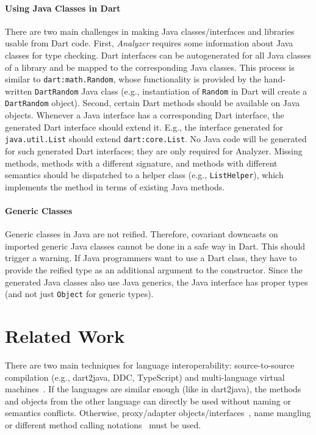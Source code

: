 \documentclass[sigplan]{acmart}
\begin{document}
\paragraph{Using Java Classes in Dart}
There are two main challenges in making Java classes/interfaces and libraries usable from Dart code. First, \emph{Analyzer} requires some information about Java classes for type checking. Dart interfaces can be autogenerated for all Java classes of a library and be mapped to the corresponding Java classes. This process is similar to \texttt{dart:math.Random}, whose functionality is provided by the hand-written \texttt{DartRandom} Java class (e.g., instantiation of \texttt{Random} in Dart will create a \texttt{DartRandom} object). Second, certain Dart methods should be available on Java objects. Whenever a Java interface has a corresponding Dart interface, the generated Dart interface should extend it. E.g., the interface generated for \texttt{java.util.List} should extend \texttt{dart:core.List}. No Java code will be generated for such generated Dart interfaces; they are only required for Analyzer. Missing methods, methods with a different signature, and methods with different semantics should be dispatched to a helper class (e.g., \texttt{ListHelper}), which implements the method in terms of existing Java methods.

\paragraph{Generic Classes}
Generic classes in Java are not reified. Therefore, covariant downcasts on imported generic Java classes cannot be done in a safe way in Dart. This should trigger a warning. If Java programmers want to use a Dart class, they have to provide the reified type as an additional argument to the constructor. Since the generated Java classes also use Java generics, the Java interface has proper types (and not just \texttt{Object} for generic types).


\section{Related Work}
There are two main techniques for language interoperability: source-to-source compilation (e.g., dart2java, DDC, TypeScript) and multi-language virtual machines~\cite{multivm_saarlang, vranythesis}. If the languages are similar enough (like in dart2java), the methods and objects from the other language can directly be used without naming or semantics conflicts. Otherwise, proxy/adapter objects/interfaces~\cite{DBLP:journals/jot/EkmanMS07}, name mangling or different method calling notations~\cite{DBLP:journals/corr/Springer16} must be used. 
\end{document}

